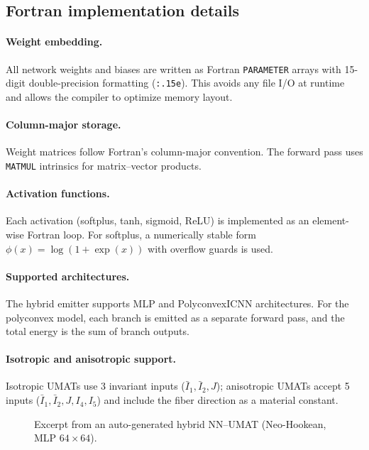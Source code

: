 \subsection{Fortran implementation details}
\label{sec:fortran_export:details}

\paragraph{Weight embedding.}
All network weights and biases are written as Fortran \texttt{PARAMETER}
arrays with 15-digit double-precision formatting (\texttt{:.15e}).  This
avoids any file I/O at runtime and allows the compiler to optimize memory
layout.

\paragraph{Column-major storage.}
Weight matrices follow Fortran's column-major convention.  The forward pass
uses \texttt{MATMUL} intrinsics for matrix--vector products.

\paragraph{Activation functions.}
Each activation (softplus, tanh, sigmoid, ReLU) is implemented as an
element-wise Fortran loop.  For softplus, a numerically stable form
$\phi(x) = \log(1 + \exp(x))$ with overflow guards is used.

\paragraph{Supported architectures.}
The hybrid emitter supports MLP and PolyconvexICNN architectures.  For the
polyconvex model, each branch is emitted as a separate forward pass, and
the total energy is the sum of branch outputs.

\paragraph{Isotropic and anisotropic support.}
Isotropic UMATs use 3 invariant inputs ($\bar{I}_1, \bar{I}_2, J$);
anisotropic UMATs accept 5 inputs ($\bar{I}_1, \bar{I}_2, J, I_4, I_5$)
and include the fiber direction as a material constant.

\begin{figure}[htbp]
\centering
\caption{Excerpt from an auto-generated hybrid NN--UMAT (Neo-Hookean, MLP
  $64 \times 64$).}
\label{fig:fortran_excerpt}
\end{figure}
